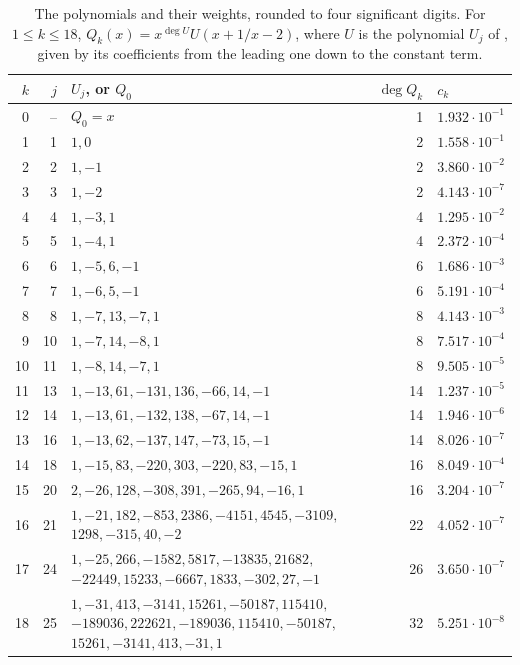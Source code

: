 \documentclass[11pt]{amsart}
\theoremstyle{remark}
\numberwithin{equation}{section}
\begin{document}
\begin{table}[ht]
\centering
\caption{The polynomials and their weights, rounded to four significant digits. For $1\le k\le18$, $Q_k(x)=x^{\deg U}U(x+1/x-2)$, where $U$ is the polynomial $U_j$ of \cite[Table~1]{Fla15}, given by its coefficients from the leading one down to the constant term.}\label{tab:polys}
\small
\begin{tabular}{@{}rrp{}rl@{}}
\toprule
$k$ & $j$ & $U_j$, or $Q_0$ & $\deg Q_k$ & $c_k$\\
\midrule
0 & -- & $Q_0=x$ & 1 & $1.932\cdot10^{-1}$\\
1 & 1 & $1,0$ & 2 & $1.558\cdot10^{-1}$\\
2 & 2 & $1,-1$ & 2 & $3.860\cdot10^{-2}$\\
3 & 3 & $1,-2$ & 2 & $4.143\cdot10^{-7}$\\
4 & 4 & $1,-3,1$ & 4 & $1.295\cdot10^{-2}$\\
5 & 5 & $1,-4,1$ & 4 & $2.372\cdot10^{-4}$\\
6 & 6 & $1,-5,6,-1$ & 6 & $1.686\cdot10^{-3}$\\
7 & 7 & $1,-6,5,-1$ & 6 & $5.191\cdot10^{-4}$\\
8 & 8 & $1,-7,13,-7,1$ & 8 & $4.143\cdot10^{-3}$\\
9 & 10 & $1,-7,14,-8,1$ & 8 & $7.517\cdot10^{-4}$\\
10 & 11 & $1,-8,14,-7,1$ & 8 & $9.505\cdot10^{-5}$\\
11 & 13 & $1,-13,61,-131,136,-66,14,-1$ & 14 & $1.237\cdot10^{-5}$\\
12 & 14 & $1,-13,61,-132,138,-67,14,-1$ & 14 & $1.946\cdot10^{-6}$\\
13 & 16 & $1,-13,62,-137,147,-73,15,-1$ & 14 & $8.026\cdot10^{-7}$\\
14 & 18 & $1,-15,83,-220,303,-220,83,-15,1$ & 16 & $8.049\cdot10^{-4}$\\
15 & 20 & $2,-26,128,-308,391,-265,94,-16,1$ & 16 & $3.204\cdot10^{-7}$\\
16 & 21 & $1,-21,182,-853,2386,-4151,4545,-3109,$ $1298,-315,40,-2$ & 22 & $4.052\cdot10^{-7}$\\
17 & 24 & $1,-25,266,-1582,5817,-13835,21682,$ $-22449,15233,-6667,1833,-302,27,-1$ & 26 & $3.650\cdot10^{-7}$\\
18 & 25 & $1,-31,413,-3141,15261,-50187,115410,$ $-189036,222621,-189036,115410,-50187,$ $15261,-3141,413,-31,1$ & 32 & $5.251\cdot10^{-8}$\\
\bottomrule
\end{tabular}
\end{table}
\end{document}
